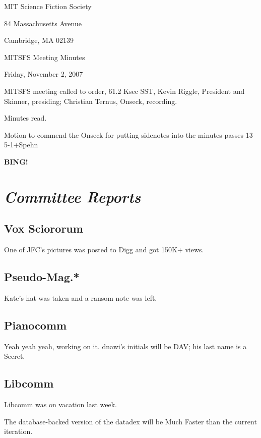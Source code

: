 \documentclass[10pt]{article}
\newcommand{\bing}{{\bf BING!} }
\newcommand{\goto}[1]{\bing \vskip 12pt \section*{{\em{#1}}}}
\begin{document}
\begin{center}

MIT Science Fiction Society

84 Massachusetts Avenue

Cambridge, MA 02139

\vspace{12pt}

MITSFS Meeting Minutes

Friday, November 2, 2007

\end{center}

\vspace{18pt}

\setlength{\parskip}{6pt}

\noindent
MITSFS meeting called to order, 61.2 Ksec SST,
Kevin Riggle, President and Skinner, presiding; Christian Ternus, Onseck, recording.

Minutes read.

Motion to commend the Onseck for putting sidenotes into the minutes passes 13-5-1+Spehn

\BING

\goto{Committee Reports}

\subsection*{Vox Sciororum}

One of JFC's pictures was posted to Digg and got 150K+ views.

\subsection*{Pseudo-Mag.*}

Kate's hat was taken and a ransom note was left.

\subsection*{Pianocomm}

Yeah yeah yeah, working on it.  dnawi's initials will be DAV; his last name is a Secret.

\subsection*{Libcomm}

Libcomm was on vacation last week.

The database-backed version of the datadex will be Much Faster than the current iteration.
\end{document}
